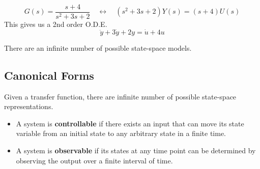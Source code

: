 \begin{ex}{}
\[G(s) = \frac{s+4}{s^{2}+3s+2} \quad \longleftrightarrow \quad (s^{2}+3s+2)Y(s) = (s+4)U(s)\]
This gives us a 2nd order O.D.E.
\[\ddot{y}+3\dot{y}+2y = \dot{u}+4u\]
\end{ex}
There are an infinite number of possible state-space models.

\subsection{Canonical Forms}
Given a transfer function, there are infinite number of possible state-space representations.
\begin{itemize}
    \item A system is \textbf{controllable} if there exists an input that can move its state variable from an initial state to any arbitrary state in a finite time.
    
    \item A system is \textbf{observable} if its states at any time point can be determined by observing the output over a finite interval of time.
\end{itemize}

